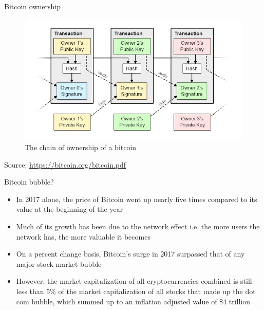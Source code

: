 \documentclass[10pt]{beamer}
\begin{document}
\begin{frame}{Bitcoin ownership}
	\begin{figure}[]
		\centering
		\includegraphics  [scale=0.5]{Images/ownership}
		\caption{The chain of ownership of a bitcoin}
	\end{figure}
	\begin{tiny}
		Source: \href{https://bitcoin.org/bitcoin.pdf}{https://bitcoin.org/bitcoin.pdf}
	\end{tiny}
\end{frame}


\begin{frame}{Bitcoin bubble?}
	\begin{itemize}
		\item In 2017 alone, the price of Bitcoin went up nearly five times compared to its value at the beginning of the year
		\item Much of its growth has been due to the network effect i.e. the more users the network has, the more valuable it becomes
		\item On a percent change basis, Bitcoin's surge in 2017 surpassed that of any major stock market bubble
		\item However, the market capitalization of all cryptocurrencies combined is still less than 5\% of the market capitalization of all stocks that made up the dot com bubble, which summed up to an inflation adjusted value of \$4 trillion
	\end{itemize}
\end{frame}
\end{document}

